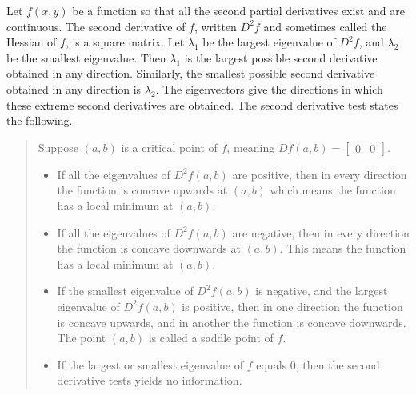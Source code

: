 \begin{theorem}
Let $f(x,y)$ be a function so that all the second partial derivatives exist and are continuous. The second derivative of $f$, written $D^2f$ and sometimes called the Hessian of $f$, is a square matrix. Let $\lambda_1$ be the largest eigenvalue of $D^2f$, and $\lambda_2$ be the smallest eigenvalue. Then $\lambda_1$ is the largest possible second derivative obtained in any direction. Similarly, the smallest possible second derivative obtained in any direction is $\lambda_2$. The eigenvectors give the directions in which these extreme second derivatives are obtained.  The second derivative test states the following.
\begin{quote}
Suppose $(a,b)$ is a critical point of $f$, meaning $Df(a,b) = \begin{bmatrix}0&0\end{bmatrix}$.  
\begin{itemize}
 \item If all the eigenvalues of $D^2f(a,b)$ are positive, then in every direction the function is concave upwards at $(a,b)$ which means the function has a local minimum at $(a,b)$. 
 \item If all the eigenvalues of $D^2f(a,b)$ are negative, then in every direction the function is concave downwards at $(a,b)$. This means the function has a local minimum at $(a,b)$. 
 \item If the smallest eigenvalue of $D^2f(a,b)$ is negative, and the largest eigenvalue of $D^2f(a,b)$ is positive, then  in one direction the function is concave upwards, and in another the function is concave downwards. The point $(a,b)$ is called a saddle point of $f$.
 \item If the largest or smallest eigenvalue of $f$ equals 0, then the second derivative tests yields no information. 
\end{itemize}
 
\end{quote}
  
 
\end{theorem}


